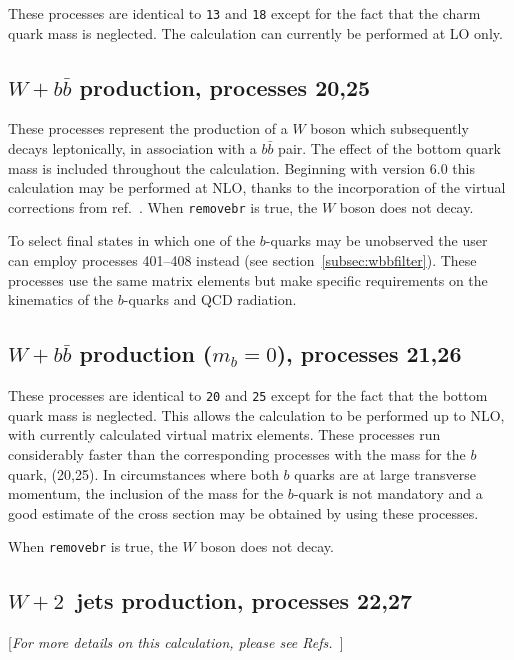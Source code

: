 These processes are identical to {\tt 13} and {\tt 18} except for the fact
that the charm quark mass is neglected. The calculation can currently be
performed at LO only.

\subsection{$W+b{\bar b}$ production, processes 20,25}
\label{subsec:wbb}

These processes represent the production of a $W$ boson which subsequently
decays leptonically, in association with a $b{\bar b}$ pair. The effect of
the bottom quark mass is included throughout the calculation.  
Beginning with \MCFM{} version 6.0 this calculation may be performed at NLO, thanks to
the incorporation of the virtual corrections from ref.~\cite{Badger:2010mg}.
When {\tt removebr} is true, the $W$ boson does not decay.

To select final states in which one of the $b$-quarks may be unobserved the
user can employ processes 401--408 instead (see section~\ref{subsec:wbbfilter}).
These processes use the same matrix
elements but make specific requirements on the kinematics of the $b$-quarks
and QCD radiation. 

\subsection{$W+b{\bar b}$ production ($m_b=0$), processes 21,26}
\label{subsec:wbbmassless}

These processes are identical to {\tt 20} and {\tt 25} except for the fact
that the bottom quark mass is neglected. This allows the calculation to be
performed up to NLO, with currently calculated virtual matrix elements. These 
processes run considerably faster than the corresponding processes with the mass
for the $b$ quark, (20,25). In circumstances where both $b$ quarks are at large 
transverse momentum, the inclusion of the mass for the $b$-quark is not mandatory
and a good estimate of the cross section may be obtained by using these processes.

When {\tt removebr} is true, the $W$ boson does not decay.

\subsection{$W+2$~jets production, processes 22,27}
\label{subsec:w2jets}

\begin{center}
[{\it For more details on this calculation, please see Refs.~\cite{Campbell:2002tg,Campbell:2003hd}}]
\end{center}

